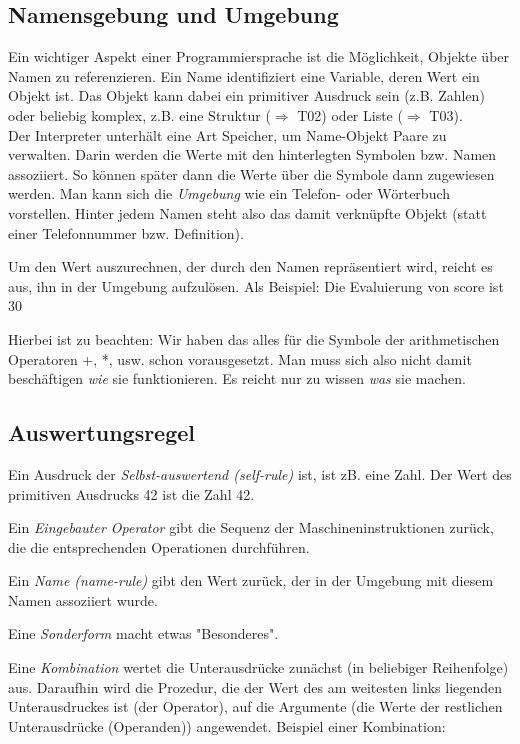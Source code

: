 \subsection{Namensgebung und Umgebung}
Ein wichtiger Aspekt einer Programmiersprache ist die Möglichkeit, Objekte über Namen zu referenzieren.  Ein Name identifiziert eine Variable, deren Wert ein Objekt ist. Das Objekt kann dabei ein primitiver Ausdruck sein (z.B. Zahlen) oder  beliebig komplex, z.B. eine Struktur ($\Rightarrow$ T02) oder Liste ($\Rightarrow$ T03).\\

Der Interpreter unterhält eine Art Speicher, um Name-Objekt Paare zu verwalten. Darin werden die Werte mit den hinterlegten Symbolen bzw. Namen assoziiert. So können später dann die Werte über die Symbole dann zugewiesen werden. Man kann sich die \textit{Umgebung} wie ein Telefon- oder Wörterbuch vorstellen. Hinter jedem Namen steht also das damit verknüpfte Objekt (statt einer Telefonnummer bzw. Definition).

Um den Wert auszurechnen, der durch den Namen repräsentiert wird, reicht es aus, ihn in der Umgebung aufzulösen. Als Beispiel: Die Evaluierung von score ist 30

Hierbei ist zu beachten: Wir haben das alles für die Symbole der arithmetischen Operatoren +, *, usw. schon vorausgesetzt. Man muss sich also nicht damit beschäftigen \textit{wie} sie funktionieren. Es reicht nur zu wissen \textit{was} sie machen.

\subsection{Auswertungsregel}
Ein Ausdruck der \textit{Selbst-auswertend (self-rule)} ist, ist zB. eine Zahl. Der Wert des primitiven Ausdrucks 42 ist die Zahl 42.

Ein \textit{Eingebauter Operator} gibt die Sequenz der Maschineninstruktionen zurück, die die entsprechenden Operationen durchführen.

Ein \textit{Name (name-rule)} gibt den Wert zurück, der in der Umgebung mit diesem Namen assoziiert wurde.

Eine \textit{Sonderform} macht etwas "Besonderes".

Eine \textit{Kombination} wertet die Unterausdrücke zunächst (in beliebiger Reihenfolge) aus. Daraufhin wird die Prozedur, die der Wert des am weitesten links liegenden Unterausdruckes ist (der Operator), auf die Argumente (die Werte der restlichen Unterausdrücke (Operanden)) angewendet.
Beispiel einer Kombination: 


